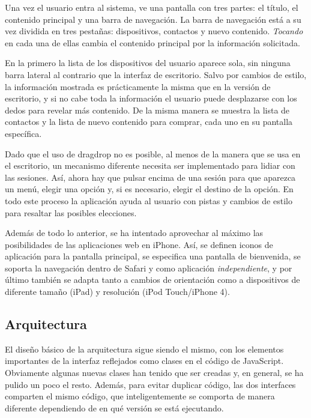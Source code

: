 Una vez el usuario entra al sistema, ve una pantalla con tres partes: el título, el contenido principal y una barra de navegación.
La barra de navegación está a su vez dividida en tres pestañas: dispositivos, contactos y nuevo contenido.
\emph{Tocando} en cada una de ellas cambia el contenido principal por la información solicitada.

En la primero la lista de los dispositivos del usuario aparece sola, sin ninguna barra lateral al contrario que la interfaz de escritorio.
Salvo por cambios de estilo, la información mostrada es prácticamente la misma que en la versión de escritorio, y si no cabe toda la información el usuario puede desplazarse con los dedos para revelar más contenido.
De la misma manera se muestra la lista de contactos y la lista de nuevo contenido para comprar, cada uno en su pantalla específica.

Dado que el uso de drag\et{}drop no es posible, al menos de la manera que se usa en el escritorio, un mecanismo diferente necesita ser implementado para lidiar con las sesiones.
Así, ahora hay que pulsar encima de una sesión para que aparezca un menú, elegir una opción y, si es necesario, elegir el destino de la opción.
En todo este proceso la aplicación ayuda al usuario con pistas y cambios de estilo para resaltar las posibles elecciones.

Además de todo lo anterior, se ha intentado aprovechar al máximo las posibilidades de las aplicaciones web en iPhone.
Así, se definen iconos de aplicación para la pantalla principal, se especifica una pantalla de bienvenida, se soporta la navegación dentro de Safari y como aplicación \emph{independiente}, y por último también se adapta tanto a cambios de orientación como a dispositivos de diferente tamaño (iPad) y resolución (iPod Touch/iPhone 4).


\subsection{Arquitectura} %
\label{sub:arquitectura}

El diseño básico de la arquitectura sigue siendo el mismo, con los elementos importantes de la interfaz reflejados como clases en el código de JavaScript.
Obviamente algunas nuevas clases han tenido que ser creadas y, en general, se ha pulido un poco el resto.
Además, para evitar duplicar código, las dos interfaces comparten el mismo código, que inteligentemente se comporta de manera diferente dependiendo de en qué versión se está ejecutando.


